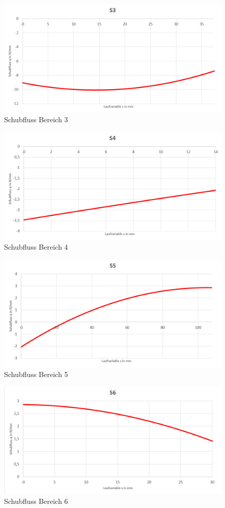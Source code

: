 \begin{figure}[h]
	\includegraphics[width=1.0\textwidth]{Bilder/S3.png}
	\caption{Schubfluss Bereich 3}
\end{figure}
\begin{figure}[h]
	\includegraphics[width=1.0\textwidth]{Bilder/S4.png}
	\caption{Schubfluss Bereich 4}
	\label{fig:S4}
\end{figure}
\begin{figure}[h]
	\includegraphics[width=1.0\textwidth]{Bilder/S5.png}
	\caption{Schubfluss Bereich 5}
\end{figure}
\begin{figure}[h]
	\includegraphics[width=1.0\textwidth]{Bilder/S6.png}
	\caption{Schubfluss Bereich 6}
\end{figure}
